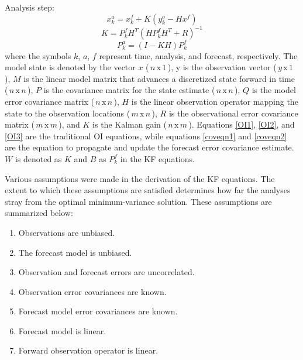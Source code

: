 \noindent Analysis step:
\begin{equation}
\label{OI2}
   x_k^a = x_k^f + K(y_k^o - Hx^f)
\end{equation}
\begin{equation}
\label{OI3}
   K = P_k^fH^T(HP_k^fH^T + R)^{-1}
\end{equation}
\begin{equation}
\label{coveqn2}
   P_k^a = (I-KH)P_k^f
\end{equation}
\noindent where the symbols \( k \), \( a \), \( f \) represent time, analysis, and forecast, respectively. The model state is denoted by the vector \( x \) (\(\,n\,\mathrm{x}\,1\,\)), y is the observation vector (\(\,y\,\mathrm{x}\,1\,\)), \( M \) is the linear model matrix that advances a discretized state forward in time (\(\,n\,\mathrm{x}\,n\,\)), \( P \) is the covariance matrix for the state estimate (\(\,n\,\mathrm{x}\,n\,\)), \( Q \) is the model error covariance matrix (\(\,n\,\mathrm{x}\,n\,\)), \( H \) is the linear observation operator mapping the state to the observation locations (\(\,m\,\mathrm{x}\,n\,\)), \( R \) is the observational error covariance matrix (\(\,m\,\mathrm{x}\,m\,\)), and \( K \) is the Kalman gain (\(\,n\,\mathrm{x}\,m\,\)). Equations \ref{OI1}, \ref{OI2}, and \ref{OI3}  are the traditional OI equations, while equations \ref{coveqn1} and \ref{coveqn2} are the equation to propagate and update the forecast error covariance estimate. \(W\) is denoted as \(K\) and \(B\) as \(P_k^f\) in the KF equations.

Various assumptions were made in the derivation of the KF equations. The extent to which these assumptions are satisfied determines how far the analyses stray from the optimal minimum-variance solution. These assumptions are summarized below:

\begin{enumerate}
\OUsinglespace
\item Observations are unbiased.
\item The forecast model is unbiased.
\item Observation and forecast errors are uncorrelated.
\item Observation error covariances are known.
\item Forecast model error covariances are known.
\item Forecast model is linear.
\item Forward observation operator is linear.
\end{enumerate}

